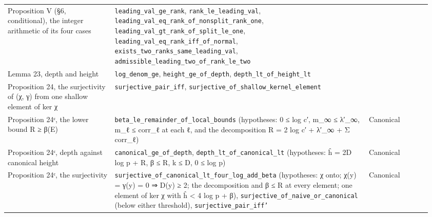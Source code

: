 \documentclass[11pt,a4paper]{article}
\theoremstyle{named}
\begin{document}
\begin{small}
\begin{longtable}{>{\raggedright\arraybackslash}p{0.242\linewidth}>{\raggedright\arraybackslash}p{0.574\linewidth}>{\raggedright\arraybackslash}p{0.143\linewidth}}
Proposition V (§6, conditional), the integer arithmetic of its four cases & \texttt{leading\_\allowbreak{}val\_\allowbreak{}ge\_\allowbreak{}rank}, \texttt{rank\_\allowbreak{}le\_\allowbreak{}leading\_\allowbreak{}val}, \texttt{leading\_\allowbreak{}val\_\allowbreak{}eq\_\allowbreak{}rank\_\allowbreak{}of\_\allowbreak{}nonsplit\_\allowbreak{}rank\_\allowbreak{}one}, \texttt{leading\_\allowbreak{}val\_\allowbreak{}gt\_\allowbreak{}rank\_\allowbreak{}of\_\allowbreak{}split\_\allowbreak{}le\_\allowbreak{}one}, \texttt{leading\_\allowbreak{}val\_\allowbreak{}eq\_\allowbreak{}rank\_\allowbreak{}iff\_\allowbreak{}of\_\allowbreak{}normal}, \texttt{exists\_\allowbreak{}two\_\allowbreak{}ranks\_\allowbreak{}same\_\allowbreak{}leading\_\allowbreak{}val}, \texttt{admissible\_\allowbreak{}leading\_\allowbreak{}two\_\allowbreak{}of\_\allowbreak{}rank\_\allowbreak{}le\_\allowbreak{}two} & 26 \\
Lemma 23, depth and height & \texttt{log\_\allowbreak{}denom\_\allowbreak{}ge}, \texttt{height\_\allowbreak{}ge\_\allowbreak{}of\_\allowbreak{}depth}, \texttt{depth\_\allowbreak{}lt\_\allowbreak{}of\_\allowbreak{}height\_\allowbreak{}lt} & 27 \\
Proposition 24, the surjectivity of (χ, γ) from one shallow element of ker χ & \texttt{surjective\_\allowbreak{}pair\_\allowbreak{}iff}, \texttt{surjective\_\allowbreak{}of\_\allowbreak{}shallow\_\allowbreak{}kernel\_\allowbreak{}element} & 27 \\
Proposition 24ᶜ, the lower bound R ≥ β(E) & \texttt{beta\_\allowbreak{}le\_\allowbreak{}remainder\_\allowbreak{}of\_\allowbreak{}local\_\allowbreak{}bounds} (hypotheses: 0 ≤ log c′, m\_∞ ≤ λ′\_∞, m\_ℓ ≤ corr\_ℓ at each ℓ, and the decomposition R = 2 log c′ + λ′\_∞ + Σ corr\_ℓ) & Canonical \\
Proposition 24ᶜ, depth against canonical height & \texttt{canonical\_\allowbreak{}ge\_\allowbreak{}of\_\allowbreak{}depth}, \texttt{depth\_\allowbreak{}lt\_\allowbreak{}of\_\allowbreak{}canonical\_\allowbreak{}lt} (hypotheses: ĥ = 2D log p + R, β ≤ R, k ≤ D, 0 ≤ log p) & Canonical \\
Proposition 24ᶜ, the surjectivity & \texttt{surjective\_\allowbreak{}of\_\allowbreak{}canonical\_\allowbreak{}lt\_\allowbreak{}four\_\allowbreak{}log\_\allowbreak{}add\_\allowbreak{}beta} (hypotheses: χ onto; χ(y) = γ(y) = 0 ⇒ D(y) ≥ 2; the decomposition and β ≤ R at every element; one element of ker χ with ĥ \textless{} 4 log p + β), \texttt{surjective\_\allowbreak{}of\_\allowbreak{}naive\_\allowbreak{}or\_\allowbreak{}canonical} (below either threshold), \texttt{surjective\_\allowbreak{}pair\_\allowbreak{}iff'} & Canonical \\

\end{longtable}
\end{small}
\end{document}
